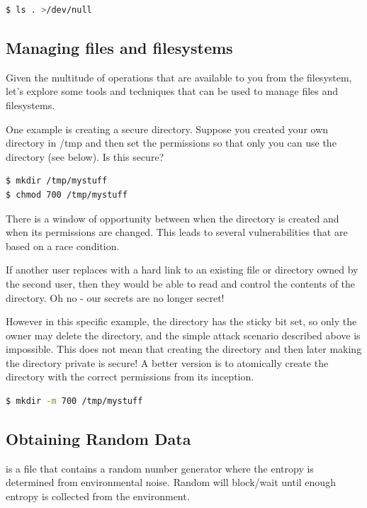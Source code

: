 \begin{lstlisting}[language=bash]
$ ls . >/dev/null
\end{lstlisting}

\subsection{Managing files and filesystems}

Given the multitude of operations that are available to you from the filesystem, let's explore some tools and techniques that can be used to manage files and filesystems.

One example is creating a secure directory.
Suppose you created your own directory in /tmp and then set the permissions so that only you can use the directory (see below).
Is this secure?

\begin{lstlisting}[language=bash]
$ mkdir /tmp/mystuff
$ chmod 700 /tmp/mystuff
\end{lstlisting}

There is a window of opportunity between when the directory is created and when its permissions are changed.
This leads to several vulnerabilities that are based on a race condition.

If another user replaces  with a hard link to an existing file or directory owned by the second user, then they would be able to read and control the contents of the  directory.
Oh no - our secrets are no longer secret!

However in this specific example, the  directory has the sticky bit set, so only the owner may delete the  directory, and the simple attack scenario described above is impossible.
This does not mean that creating the directory and then later making the directory private is secure!
A better version is to atomically create the directory with the correct permissions from its inception.

\begin{lstlisting}[language=bash]
$ mkdir -m 700 /tmp/mystuff
\end{lstlisting}

\subsection{Obtaining Random Data}

 is a file that contains a random number generator where the entropy is determined from environmental noise.
Random will block/wait until enough entropy is collected from the environment.

